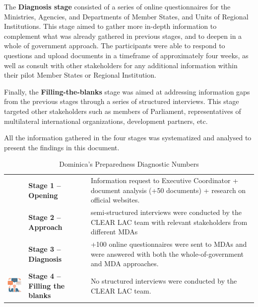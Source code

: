 \documentclass[
  10pt,
]{book}
\begin{document}
The \textbf{Diagnosis stage} consisted of a series of online questionnaires for the Ministries, Agencies, and Departments of Member States, and Units of Regional Institutions. This stage aimed to gather more in-depth information to complement what was already gathered in previous stages, and to deepen in a whole of government approach. The participants were able to respond to questions and upload documents in a timeframe of approximately four weeks, as well as consult with other stakeholders for any additional information within their pilot Member States or Regional Institution.

Finally, the \textbf{Filling-the-blanks} stage was aimed at addressing information gaps from the previous stages through a series of structured interviews. This stage targeted other stakeholders such as members of Parliament, representatives of multilateral international organizations, development partners, etc.

All the information gathered in the four stages was systematized and analysed to present the findings in this document.

\begin{longtable}[]{@{}
  >{\raggedright\arraybackslash}p{}
  >{\centering\arraybackslash}p{}
  >{\raggedleft\arraybackslash}p{}@{}}
\caption{\label{tab:table1} Dominica's Preparedness Diagnostic Numbers}\tabularnewline
\toprule
\endhead
& \textbf{Stage 1 -- Opening} & Information request to Executive Coordinator + document analysis (+50 documents) + research on official websites. \\
& \textbf{Stage 2 -- Approach} & 7 semi-structured interviews were conducted by the CLEAR LAC team with relevant stakeholders from different MDAs \\
& \textbf{Stage 3 -- Diagnosis} & +100 online questionnaires were sent to MDAs and were answered with both the whole-of-government and MDA approaches. \\
\includegraphics{./images/tb1_4.png} & \textbf{Stage 4 -- Filling the blanks} & No structured interviews were conducted by the CLEAR LAC team. \\
\bottomrule
\end{longtable}
\end{document}
